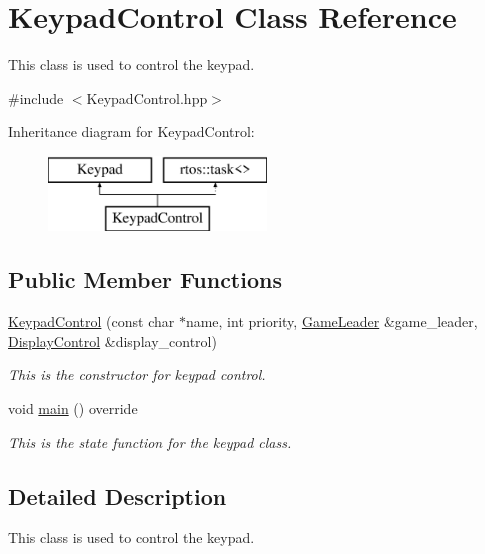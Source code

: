 \hypertarget{class_keypad_control}{}\section{Keypad\+Control Class Reference}
\label{class_keypad_control}


This class is used to control the keypad.  




{\ttfamily \#include $<$Keypad\+Control.\+hpp$>$}

Inheritance diagram for Keypad\+Control\+:\begin{figure}[H]
\begin{center}
\leavevmode
\includegraphics[height=2.000000cm]{class_keypad_control}
\end{center}
\end{figure}
\subsection*{Public Member Functions}
\begin{DoxyCompactItemize}
\item 
\mbox{\hyperlink{class_keypad_control_ade69a59ba2a34bde40809433952cb153}{Keypad\+Control}} (const char $\ast$name, int priority, \mbox{\hyperlink{class_game_leader}{Game\+Leader}} \&game\+\_\+leader, \mbox{\hyperlink{class_display_control}{Display\+Control}} \&display\+\_\+control)
\begin{DoxyCompactList}\small\item\em This is the constructor for keypad control. \end{DoxyCompactList}\item 
void \mbox{\hyperlink{class_keypad_control_a66ec8a33eceb20d5d1d243c270c3718b}{main}} () override
\begin{DoxyCompactList}\small\item\em This is the state function for the keypad class. \end{DoxyCompactList}\end{DoxyCompactItemize}


\subsection{Detailed Description}
This class is used to control the keypad. 

